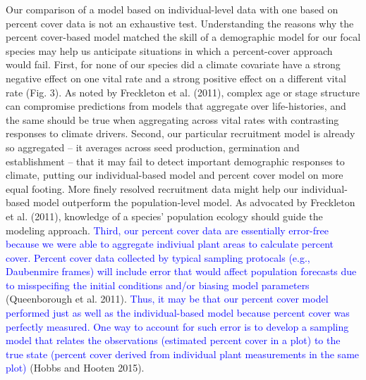 \documentclass[12pt,]{article}
\begin{document}
Our comparison of a model based on individual-level data with one based
on percent cover data is not an exhaustive test. Understanding the
reasons why the percent cover-based model matched the skill of a
demographic model for our focal species may help us anticipate
situations in which a percent-cover approach would fail. First, for none
of our species did a climate covariate have a strong negative effect on
one vital rate and a strong positive effect on a different vital rate
(Fig. 3). As noted by Freckleton et al. (2011), complex age or stage
structure can compromise predictions from models that aggregate over
life-histories, and the same should be true when aggregating across
vital rates with contrasting responses to climate drivers. Second, our
particular recruitment model is already so aggregated -- it averages
across seed production, germination and establishment -- that it may
fail to detect important demographic responses to climate, putting our
individual-based model and percent cover model on more equal footing.
More finely resolved recruitment data might help our individual-based
model outperform the population-level model. As advocated by Freckleton
et al. (2011), knowledge of a species' population ecology should guide
the modeling approach.
\textcolor{blue}{Third, our percent cover data are essentially error-free because we were able to aggregate indiviual plant areas to calculate percent cover.
Percent cover data collected by typical sampling protocals (e.g., Daubenmire frames) will include error that would affect population forecasts due to misspecifing the initial conditions and/or biasing model parameters}
(Queenborough et al. 2011).
\textcolor{blue}{Thus, it may be that our percent cover model performed just as well as the individual-based model because percent cover was perfectly measured.
One way to account for such error is to develop a sampling model that relates the observations (estimated percent cover in a plot) to the true state (percent cover derived from individual plant measurements in the same plot)}
(Hobbs and Hooten 2015).
\end{document}
